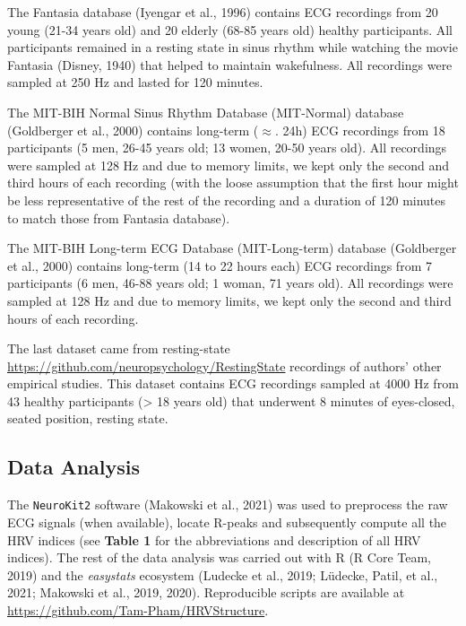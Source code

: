 \documentclass[
  english,
  jou,floatsintext]{apa6}
\begin{document}
The Fantasia database (Iyengar et al., 1996) contains ECG recordings from 20 young (21-34 years old) and 20 elderly (68-85 years old) healthy participants. All participants remained in a resting state in sinus rhythm while watching the movie Fantasia (Disney, 1940) that helped to maintain wakefulness. All recordings were sampled at 250 Hz and lasted for 120 minutes.

The MIT-BIH Normal Sinus Rhythm Database (MIT-Normal) database (Goldberger et al., 2000) contains long-term (\(\approx\). 24h) ECG recordings from 18 participants (5 men, 26-45 years old; 13 women, 20-50 years old). All recordings were sampled at 128 Hz and due to memory limits, we kept only the second and third hours of each recording (with the loose assumption that the first hour might be less representative of the rest of the recording and a duration of 120 minutes to match those from Fantasia database).

The MIT-BIH Long-term ECG Database (MIT-Long-term) database (Goldberger et al., 2000) contains long-term (14 to 22 hours each) ECG recordings from 7 participants (6 men, 46-88 years old; 1 woman, 71 years old). All recordings were sampled at 128 Hz and due to memory limits, we kept only the second and third hours of each recording.

The last dataset came from resting-state \url{https://github.com/neuropsychology/RestingState} recordings of authors' other empirical studies. This dataset contains ECG recordings sampled at 4000 Hz from 43 healthy participants (\textgreater{} 18 years old) that underwent 8 minutes of eyes-closed, seated position, resting state.

\hypertarget{data-analysis}{%
\subsection{Data Analysis}\label{data-analysis}}

The \texttt{NeuroKit2} software (Makowski et al., 2021) was used to preprocess the raw ECG signals (when available), locate R-peaks and subsequently compute all the HRV indices (see \textbf{Table 1} for the abbreviations and description of all HRV indices). The rest of the data analysis was carried out with R (R Core Team, 2019) and the \emph{easystats} ecosystem (Ludecke et al., 2019; Lüdecke, Patil, et al., 2021; Makowski et al., 2019, 2020). Reproducible scripts are available at \url{https://github.com/Tam-Pham/HRVStructure}.
\end{document}

